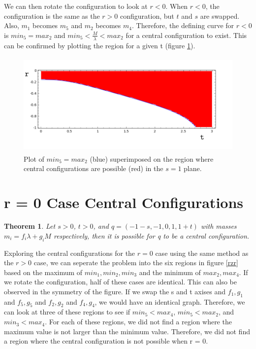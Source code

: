 \documentclass[11pt,leqno]{article}
\newtheorem{theorem}{Theorem}[section]
\theoremstyle{definition}
\theoremstyle{remark}
\numberwithin{equation}{section}
\begin{document}
We can then rotate the configuration to look at $r<0$. When $r<0$, the configuration is the same as the $r>0$ configuration, but $t$ and $s$ are swapped. Also, $m_1$ becomes $m_5$ and $m_2$ becomes $m_4$. Therefore, the defining curve for $r<0$ is $min_5=max_2$ and $min_5<\frac{M}{\lambda}<max_2$ for a central configuration to exist. This can be confirmed by plotting the region for a given t (figure \ref{rlt0ip}).


\begin{center}

\begin{figure}
\includegraphics[width=6in, height=2in]{rlt0ip.png}
 \caption{Plot of  $min_5 = max_2$ (blue) superimposed on the region where central configurations are possible (red) in the $s=1$ plane.}
 \label{rlt0ip}
\end{figure}

\end{center}



\section{r = 0 Case Central Configurations}

\begin{theorem}\label{scthm}
\emph{Let $s>0$, $t>0$, and $q=(-1-s,-1,0,1,1+t)$
with masses $m_{i}=f_{i}\lambda + g_{i}M$ respectively, then it is possible for q to be a
central configuration. }
\end{theorem}

Exploring the central configurations for the $r = 0$ case using the same method as the $r > 0$ case, we can seperate the problem into the six regions in figure \ref{rzr} based on the maximum of $min_1,min_2,min_3$ and the minimum of $max_2,max_4$. If we rotate the configuration, half of these cases are identical. This can also be observed in the symmetry of the figure. If we swap the s and t axises and $f_1,g_1$ and $f_5,g_5$ and $f_2,g_2$ and $f_4,g_4$, we would have an identical graph. Therefore, we can look at three of these regions to see if $min_5 < max_4$, $min_5<max_2$, and $min_3<max_4$. For each of these regions, we did not find a region where the maximum value is not larger than the minimum value. Therefore, we did not find a region where the central configuration is not possible when r = 0.
\end{document}
